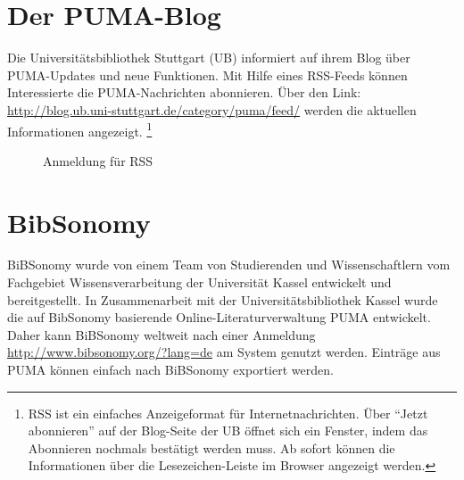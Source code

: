\section{Der PUMA-Blog}
Die Universitätsbibliothek Stuttgart (UB) informiert auf ihrem Blog über PUMA-Updates und neue Funktionen. Mit Hilfe eines RSS-Feeds können Interessierte die PUMA-Nachrichten abonnieren. Über den Link: \newline \url{http://blog.ub.uni-stuttgart.de/category/puma/feed/} werden die aktuellen Informationen angezeigt. \footnote{RSS ist ein einfaches Anzeigeformat für Internetnachrichten. Über \enquote{Jetzt abonnieren} auf der Blog-Seite der UB öffnet sich ein Fenster, indem das Abonnieren nochmals bestätigt werden muss. Ab sofort können die Informationen über die Lesezeichen-Leiste im Browser angezeigt werden.}
 \begin{figure}[h!]
 \centering
 \caption{Anmeldung für RSS}
 \label{Anmeldung für RSS}
\end{figure} 
\section{BibSonomy}
BiBSonomy wurde von einem Team von Studierenden und Wissenschaftlern vom Fachgebiet Wissensverarbeitung der Universität Kassel entwickelt und bereitgestellt. In Zusammenarbeit mit der Universitätsbibliothek Kassel wurde die auf BibSonomy basierende Online-Literaturverwaltung PUMA entwickelt. Daher kann BiBSonomy weltweit nach einer Anmeldung \newline \url{http://www.bibsonomy.org/?lang=de} am System genutzt werden. Einträge aus PUMA können einfach nach BiBSonomy exportiert werden.

